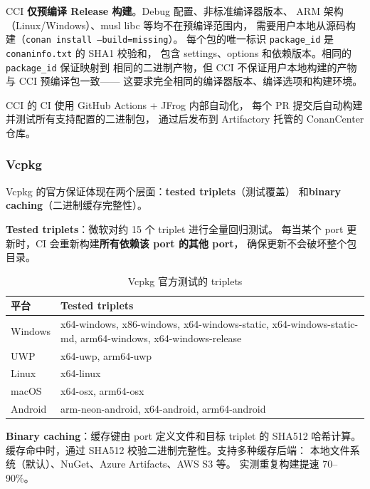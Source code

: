 \documentclass[12pt,a4paper,fontset=fandol]{ctexbook}
\begin{document}
\begin{warning}[ title={CCI 保证的边界}]
CCI \textbf{仅预编译 Release 构建}。Debug 配置、非标准编译器版本、
ARM 架构（Linux/Windows）、musl libc 等均不在预编译范围内，
需要用户本地从源码构建（\texttt{conan install --build=missing}）。
每个包的唯一标识 \texttt{package\_id} 是 \texttt{conaninfo.txt} 的 SHA1 校验和，
包含 settings、options 和依赖版本。相同的 \texttt{package\_id} 保证映射到
相同的二进制产物，但 CCI 不保证用户本地构建的产物与 CCI 预编译包一致——
这要求完全相同的编译器版本、编译选项和构建环境。
\end{warning}

CCI 的 CI 使用 GitHub Actions + JFrog 内部自动化，
每个 PR 提交后自动构建并测试所有支持配置的二进制包，
通过后发布到 Artifactory 托管的 ConanCenter 仓库。

\subsubsection*{Vcpkg}

Vcpkg 的官方保证体现在两个层面：\textbf{tested triplets}（测试覆盖）
和\textbf{binary caching}（二进制缓存完整性）。

\textbf{Tested triplets}：微软对约 15 个 triplet 进行全量回归测试。
每当某个 port 更新时，CI 会重新构建\textbf{所有依赖该 port 的其他 port}，
确保更新不会破坏整个包目录。

\begin{table}[H]
\centering
\caption{Vcpkg 官方测试的 triplets}
\label{tab:vcpkg-triplets}
\small
\begin{tabularx}{\textwidth}{l X}
\toprule
\textbf{平台} & \textbf{Tested triplets} \\
\midrule
Windows & x64-windows, x86-windows, x64-windows-static,
          x64-windows-static-md, arm64-windows, x64-windows-release \\
UWP     & x64-uwp, arm64-uwp \\
Linux   & x64-linux \\
macOS   & x64-osx, arm64-osx \\
Android & arm-neon-android, x64-android, arm64-android \\
\bottomrule
\end{tabularx}
\end{table}

\textbf{Binary caching}：缓存键由 port 定义文件和目标 triplet 的 SHA512 哈希计算。
缓存命中时，通过 SHA512 校验二进制完整性。支持多种缓存后端：
本地文件系统（默认）、NuGet、Azure Artifacts、AWS S3 等。
实测重复构建提速 70--90\%。
\end{document}
